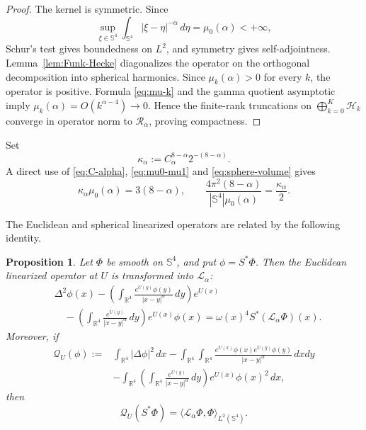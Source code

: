 \documentclass[11pt]{article}
\newtheorem{proposition}[theorem]{Proposition}
\numberwithin{equation}{section}
\begin{document}
\begin{proof}
The kernel is symmetric. Since
\[
\sup_{\xi\in\mathbb S^{4}}
\int_{\mathbb S^{4}}|\xi-\eta|^{-\alpha}\,d\eta
=\mu_{0}(\alpha)<+\infty,
\]
Schur's test gives boundedness on \(L^{2}\), and symmetry gives self-adjointness. Lemma~\ref{lem:Funk-Hecke} diagonalizes the operator on the orthogonal decomposition into spherical harmonics. Since \(\mu_k(\alpha)>0\) for every \(k\), the operator is positive. Formula \eqref{eq:mu-k} and the gamma quotient asymptotic imply \(\mu_{k}(\alpha)=O(k^{\alpha-4})\to0\). Hence the finite-rank truncations on \(\bigoplus_{k=0}^{K}\mathcal H_{k}\) converge in operator norm to \(\mathcal R_{\alpha}\), proving compactness.
\end{proof}

Set
\begin{equation}\label{eq:kappa-alpha}
\kappa_{\alpha}:=C_{\alpha}^{8-\alpha}2^{-(8-\alpha)}.
\end{equation}
A direct use of \eqref{eq:C-alpha}, \eqref{eq:mu0-mu1} and \eqref{eq:sphere-volume} gives
\begin{equation}\label{eq:kappa-identities}
\kappa_{\alpha}\mu_{0}(\alpha)=3(8-\alpha),
\qquad
\frac{4\pi^{2}(8-\alpha)}{|\mathbb S^{4}|\mu_{0}(\alpha)}
=\frac{\kappa_{\alpha}}{2}.
\end{equation}

The Euclidean and spherical linearized operators are related by the following identity.

\begin{proposition}\label{prop:conformal-linearized}
Let \(\Phi\) be smooth on \(\mathbb S^{4}\), and put \(\phi=S^{*}\Phi\). Then the Euclidean linearized operator at \(U\) is transformed into \(\mathcal L_{\alpha}\):
\begin{equation}\label{eq:conformal-linearized-identity}
\begin{aligned}
&\Delta^{2}\phi(x)
-
\left(\int_{\mathbb R^{4}}
\frac{e^{U(y)}\phi(y)}{|x-y|^{\alpha}}\,dy\right)e^{U(x)}\\
&\quad-
\left(\int_{\mathbb R^{4}}
\frac{e^{U(y)}}{|x-y|^{\alpha}}\,dy\right)e^{U(x)}\phi(x)
=
\omega(x)^{4}S^{*}(\mathcal L_{\alpha}\Phi)(x).
\end{aligned}
\end{equation}
Moreover, if
\begin{equation*}
\begin{aligned}
\mathcal Q_{U}(\phi)
:={}&\int_{\mathbb R^{4}}|\Delta\phi|^{2}\,dx
-
\int_{\mathbb R^{4}}\int_{\mathbb R^{4}}
\frac{e^{U(x)}\phi(x)e^{U(y)}\phi(y)}{|x-y|^{\alpha}}\,dxdy\\
&-
\int_{\mathbb R^{4}}
\left(\int_{\mathbb R^{4}}
\frac{e^{U(y)}}{|x-y|^{\alpha}}\,dy\right)
e^{U(x)}\phi(x)^{2}\,dx,
\end{aligned}
\end{equation*}
then
\begin{equation}\label{eq:quadratic-form-conformal}
\mathcal Q_{U}(S^{*}\Phi)
=\langle\mathcal L_{\alpha}\Phi,\Phi\rangle_{L^{2}(\mathbb S^{4})}.
\end{equation}
\end{proposition}
\end{document}
